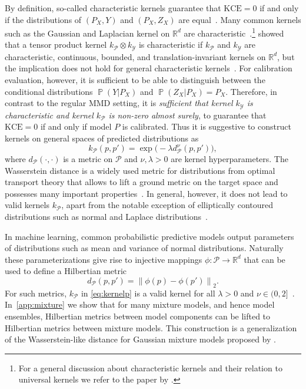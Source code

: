\documentclass{article}
\DeclareMathOperator{\Prob}{\mathbb{P}}
\begin{document}
By definition, so-called characteristic kernels guarantee that
$\mathrm{KCE} = 0$ if and only if the distributions of $(P_X,Y)$
and $(P_X,Z_X)$ are equal~\citep{Fukumizu2004,Fukumizu2008}. Many common kernels
such as the Gaussian and Laplacian kernel on $\mathbb{R}^d$ are
characteristic~\citep{Fukumizu2008}.\footnote{For a general discussion about
characteristic kernels and their relation to universal kernels we refer to the 
paper by \citet{Sriperumbudur2011}.}  showed that a
tensor product kernel $k_{\mathcal{P}} \otimes k_{\mathcal{Y}}$ is characteristic if $k_{\mathcal{P}}$ and
$k_{\mathcal{Y}}$ are characteristic, continuous, bounded, and translation-invariant kernels
on $\mathbb{R}^d$, but the implication does not hold for general characteristic
kernels~\citep[Example~1]{Szabo2018}. For calibration evaluation, however,
it is sufficient to be able to distinguish between the conditional distributions
$\Prob(Y|P_X)$ and $\Prob(Z_X|P_X) = P_X$.
Therefore, in contrast to the regular MMD setting, it
is \emph{sufficient that kernel $k_{\mathcal{Y}}$ is characteristic and kernel $k_{\mathcal{P}}$ is
non-zero almost surely}, to guarantee that $\mathrm{KCE} = 0$ if and only if model $P$ is calibrated.
Thus it is suggestive to construct kernels on general spaces of predicted distributions 
as
\begin{equation}\label{eq:kernelp}
k_{\mathcal{P}}(p, p') = \exp{\big(- \lambda d^\nu_{\mathcal{P}}(p, p') \big)},
\end{equation}
where $d_{\mathcal{P}}(\cdot, \cdot)$ is a metric on $\mathcal{P}$ and $\nu, \lambda > 0$ 
are kernel hyperparameters. The Wasserstein distance is a widely used metric for
distributions from optimal transport theory that allows to lift a ground
metric on the target space and possesses many important
properties~\citep[see, e.g.,][Chapter~2.4]{Peyre2018}. In general, however,
it does not lead to valid kernels $k_{\mathcal{P}}$, apart from the notable exception
of elliptically contoured distributions such as normal and Laplace
distributions~\citep[Chapter~8.3]{Peyre2018}.

In machine learning, common
probabilistic predictive models output parameters of distributions such as
mean and variance of normal distributions. Naturally these
parameterizations give rise to injective mappings
$\phi \colon \mathcal{P} \to \mathbb{R}^d$ that can be used to define a
Hilbertian metric
\begin{equation*}\label{eq:hilbertian}
    d_{\mathcal{P}}(p, p') = {\|\phi(p) - \phi(p')\|}_2.
\end{equation*}
For such metrics, $k_{\mathcal{P}}$ in \cref{eq:kernelp}
is a valid kernel for all $\lambda > 0$ and
$\nu \in (0, 2]$~\citep[Corollary~3.3.3, Proposition~3.2.7]{Berg1984}.
In~\cref{app:mixture} we show that for many mixture models, and hence model ensembles,
Hilbertian metrics between model components
can be lifted to Hilbertian metrics between mixture models. This construction
is a generalization of the Wasserstein-like distance for Gaussian mixture models proposed
by \citet{Delon2019,Chen2019,Chen2020}.
\end{document}
